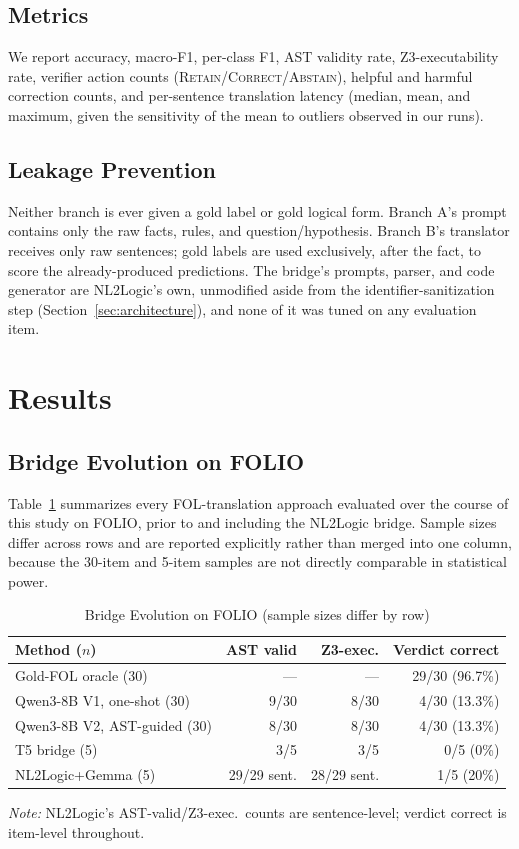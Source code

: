 \documentclass[conference]{IEEEtran}
\begin{document}
\subsection{Metrics}
We report accuracy, macro-F1, per-class F1, AST validity rate, Z3-executability rate, verifier action counts (\textsc{Retain}/\textsc{Correct}/\textsc{Abstain}), helpful and harmful correction counts, and per-sentence translation latency (median, mean, and maximum, given the sensitivity of the mean to outliers observed in our runs).

\subsection{Leakage Prevention}
\label{sec:leakage}
Neither branch is ever given a gold label or gold logical form. Branch A's prompt contains only the raw facts, rules, and question/hypothesis. Branch B's translator receives only raw sentences; gold labels are used exclusively, after the fact, to score the already-produced predictions. The bridge's prompts, parser, and code generator are NL2Logic's own, unmodified aside from the identifier-sanitization step (Section~\ref{sec:architecture}), and none of it was tuned on any evaluation item.

\section{Results}
\label{sec:results}

\subsection{Bridge Evolution on FOLIO}

Table~\ref{tab:folio-evolution} summarizes every FOL-translation approach evaluated over the course of this study on FOLIO, prior to and including the NL2Logic bridge. Sample sizes differ across rows and are reported explicitly rather than merged into one column, because the 30-item and 5-item samples are not directly comparable in statistical power.

\begin{table}[t]
\caption{Bridge Evolution on FOLIO (sample sizes differ by row)}
\label{tab:folio-evolution}
\centering
\footnotesize
\setlength{\tabcolsep}{3pt}
\begin{tabular}{@{}lrrr@{}}
\toprule
Method ($n$) & AST valid & Z3-exec. & Verdict correct \\
\midrule
Gold-FOL oracle (30) & --- & --- & 29/30 (96.7\%) \\
Qwen3-8B V1, one-shot (30) & 9/30 & 8/30 & 4/30 (13.3\%) \\
Qwen3-8B V2, AST-guided (30) & 8/30 & 8/30 & 4/30 (13.3\%) \\
T5 bridge (5) & 3/5 & 3/5 & 0/5 (0\%) \\
NL2Logic+Gemma (5) & 29/29 sent. & 28/29 sent. & 1/5 (20\%) \\
\bottomrule
\end{tabular}
\vspace{2pt}
{\footnotesize\emph{Note:} NL2Logic's AST-valid/Z3-exec.\ counts are sentence-level; verdict correct is item-level throughout.}
\end{table}
\end{document}
